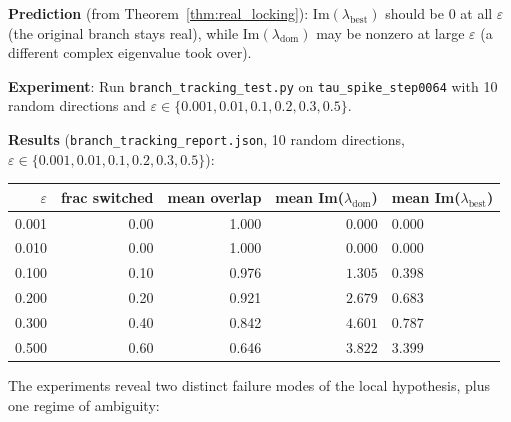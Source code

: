 \documentclass[11pt]{amsart}
\begin{document}
\textbf{Prediction} (from Theorem~\ref{thm:real_locking}):
$\mathrm{Im}(\lambda_\mathrm{best})$ should be $0$ at all $\varepsilon$
(the original branch stays real), while $\mathrm{Im}(\lambda_\mathrm{dom})$
may be nonzero at large $\varepsilon$ (a different complex eigenvalue took over).

\textbf{Experiment}: Run \texttt{branch\_tracking\_test.py} on
\texttt{tau\_spike\_step0064} with 10 random directions and
$\varepsilon \in \{0.001, 0.01, 0.1, 0.2, 0.3, 0.5\}$.

\textbf{Results} (\texttt{branch\_tracking\_report.json},
10 random directions, $\varepsilon \in \{0.001, 0.01, 0.1, 0.2, 0.3, 0.5\}$):

\begin{center}\small
\begin{tabular}{@{}rrrrl@{}}
\toprule
$\varepsilon$ & frac switched & mean overlap & mean Im($\lambda_\mathrm{dom}$)
  & mean Im($\lambda_\mathrm{best}$) \\
\midrule
0.001 & 0.00 & 1.000 & $0.000$ & $0.000$ \\
0.010 & 0.00 & 1.000 & $0.000$ & $0.000$ \\
0.100 & 0.10 & 0.976 & $1.305$ & $0.398$ \\
0.200 & 0.20 & 0.921 & $2.679$ & $0.683$ \\
0.300 & 0.40 & 0.842 & $4.601$ & $0.787$ \\
0.500 & 0.60 & 0.646 & $3.822$ & $3.399$ \\
\bottomrule
\end{tabular}
\end{center}

The experiments reveal two distinct failure modes of the local hypothesis,
plus one regime of ambiguity:
\end{document}
